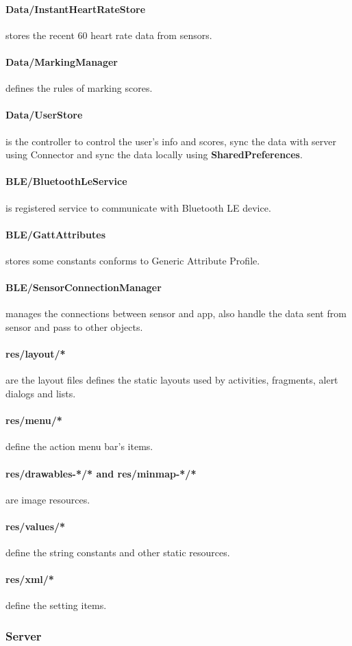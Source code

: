 \documentclass[10pt,a4paper,final]{scrartcl}
\begin{document}
\paragraph{Data/InstantHeartRateStore} stores the recent 60 heart rate data from sensors.
\paragraph{Data/MarkingManager} defines the rules of marking scores.
\paragraph{Data/UserStore} is the controller to control the user's info and scores, sync the data with server using Connector and sync the data locally using {\bf SharedPreferences}.
\paragraph{BLE/BluetoothLeService} is registered service to communicate with Bluetooth LE device.
\paragraph{BLE/GattAttributes} stores some constants conforms to Generic Attribute Profile.
\paragraph{BLE/SensorConnectionManager} manages the connections between sensor and app, also handle the data sent from sensor and pass to other objects.


\paragraph{res/layout/*} are the layout files defines the static layouts used by activities, fragments, alert dialogs and lists.
\paragraph{res/menu/*} define the action menu bar's items.
\paragraph{res/drawables-*/* and res/minmap-*/*} are image resources.
\paragraph{res/values/*} define the string constants and other static resources.
\paragraph{res/xml/*} define the setting items.





\subsubsection{Server}
\end{document}
